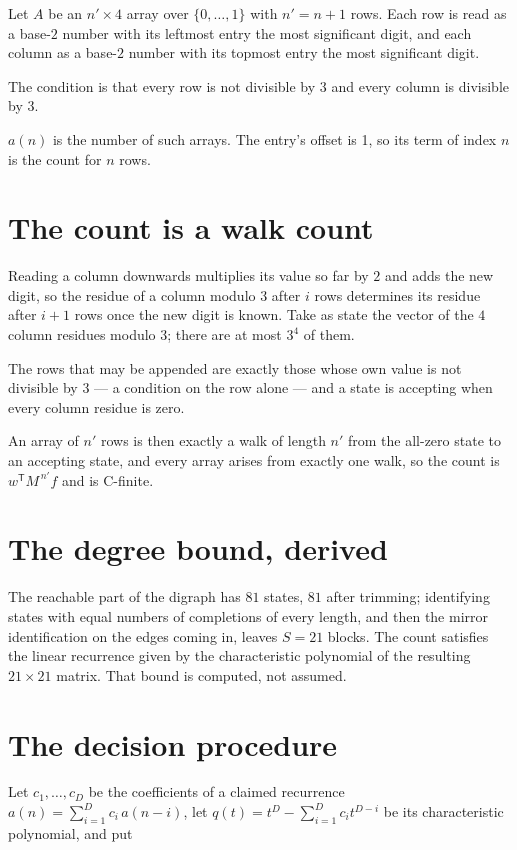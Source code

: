 \documentclass[11pt]{article}
\theoremstyle{definition}
\begin{document}
Let $A$ be an $n' \times 4$ array over $\{0,\dots,1\}$ with $n' = n + 1$ rows. Each row is read as a base-$2$ number with its leftmost entry the most significant digit, and each column as a base-$2$ number with its topmost entry the most significant digit.

The condition is that every row is not divisible by $3$ and every column is divisible by $3$.

$a(n)$ is the number of such arrays. The entry's offset is 1, so its term of index $n$ is the count for $n$ rows.

\section{The count is a walk count}

Reading a column downwards multiplies its value so far by $2$ and adds the new digit, so the residue of a column modulo $3$ after $i$ rows determines its residue after $i+1$ rows once the new digit is known. Take as state the vector of the $4$ column residues modulo $3$; there are at most $3^{4}$ of them.

The rows that may be appended are exactly those whose own value is not divisible by $3$ --- a condition on the row alone --- and a state is accepting when every column residue is zero.

An array of $n'$ rows is then exactly a walk of length $n'$ from the all-zero state to an accepting state, and every array arises from exactly one walk, so the count is $w^{\mathsf T}M^{\,n'}f$ and is C-finite.

\section{The degree bound, derived}

The reachable part of the digraph has $81$ states, $81$ after trimming; identifying states with equal numbers of completions of every length, and then the mirror identification on the edges coming in, leaves $S = 21$ blocks. The count satisfies the linear recurrence given by the characteristic polynomial of the resulting $21\times21$ matrix. That bound is computed, not assumed.

\section{The decision procedure}

Let $c_1,\dots,c_D$ be the coefficients of a claimed recurrence $a(n) = \sum_{i=1}^{D} c_i\,a(n-i)$, let $q(t) = t^{D} - \sum_{i=1}^{D} c_i t^{D-i}$ be its characteristic polynomial, and put
\end{document}
